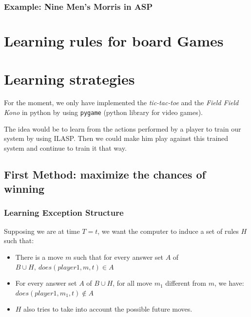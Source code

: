 \documentclass[12pt,twoside]{report}
\begin{document}
\subsection{Example: Nine Men's Morris in ASP}
%



\chapter{Learning rules for board Games}





\chapter{Learning strategies}

% 

For the moment, we only have implemented the \textit{tic-tac-toe} and the \textit{Field Field Kono} in python by using \texttt{pygame} (python library for video games).
\smallskip

The idea would be to learn from the actions performed by a player to train our system by using ILASP. Then we could make him play against this trained system and continue to train it that way.

\section{First Method: maximize the chances of winning}

\subsection{Learning Exception Structure}

Supposing we are at time $T=t$, we want the computer to induce a set of rules $H$ such that:
\begin{itemize}
\item There is a move $m$ such that for every answer set $A$ of $B\cup H,\:  does(player1, m, t)\in A$
\item For every answer set $A$ of $B\cup H$, for all move $m_1$ different from $m$, we have: $does(player1, m_1, t) \notin A$
\item $H$ also tries to take into account the possible future moves.
\end{itemize}
\end{document}
